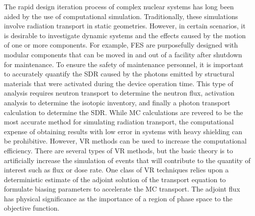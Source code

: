 The rapid design iteration process of complex nuclear systems has long been
aided by the use of computational simulation.  Traditionally, these simulations
involve radiation transport in static geometries.  However, in certain
scenarios, it is desirable to investigate dynamic systems and the effects caused
by the motion of one or more components.  
For example, FES are purposefully designed with modular components that can be moved in and
out of a facility after shutdown for maintenance.  
To ensure the safety of maintenance personnel, it is important to accurately quantify the
SDR caused by the photons emitted by structural materials that were
activated during the device operation time.  
This type of analysis requires neutron transport to determine the neutron flux,
activation analysis to determine the isotopic inventory, and finally a 
photon transport calculation to determine the SDR.
While MC calculations are revered to be the most accurate method for simulating
radiation transport, the computational expense of obtaining results with low
error 
in systems with heavy shielding can be prohibitive.  
However, VR
methods can be used to increase the computational efficiency.  
There are several types
of VR methods, but the basic theory is to artificially increase the simulation of
events that will contribute to the quantity of interest such as flux or dose
rate. 
 One class of VR techniques relies upon a deterministic estimate of the adjoint 
solution of the transport equation to
formulate biasing parameters to accelerate the MC transport. 
The adjoint flux has physical significance as the importance of a region of
phase space to the objective function.

